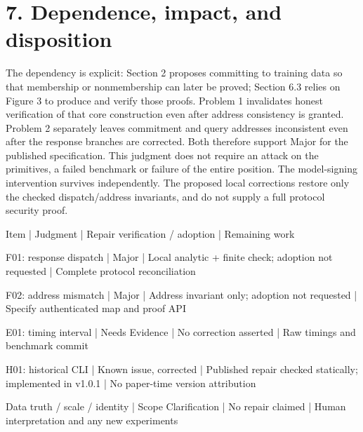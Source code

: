 \documentclass[10pt]{article}
\begin{document}
\section*{7. Dependence, impact, and disposition}
The dependency is explicit: Section 2 proposes committing to training data so that membership or nonmembership can later be proved; Section 6.3 relies on Figure 3 to produce and verify those proofs. Problem 1 invalidates honest verification of that core construction even after address consistency is granted. Problem 2 separately leaves commitment and query addresses inconsistent even after the response branches are corrected. Both therefore support Major for the published specification. This judgment does not require an attack on the primitives, a failed benchmark or failure of the entire position. The model-signing intervention survives independently. The proposed local corrections restore only the checked dispatch/address invariants, and do not supply a full protocol security proof.\par
Item | Judgment | Repair verification / adoption | Remaining work\par
F01: response dispatch | Major | Local analytic + finite check; adoption not requested | Complete protocol reconciliation\par
F02: address mismatch | Major | Address invariant only; adoption not requested | Specify authenticated map and proof API\par
E01: timing interval | Needs Evidence | No correction asserted | Raw timings and benchmark commit\par
H01: historical CLI | Known issue, corrected | Published repair checked statically; implemented in v1.0.1 | No paper-time version attribution\par
Data truth / scale / identity | Scope Clarification | No repair claimed | Human interpretation and any new experiments\par
\end{document}
